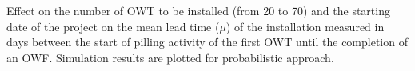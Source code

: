 \label{fig:effectnumber}
Effect on the number of OWT to be installed (from 20 to 70) and the starting date of the project on the mean lead time ($\mu$) of the installation measured in days between the start of pilling activity of the first OWT until the completion of an OWF. Simulation results are plotted for probabilistic approach.